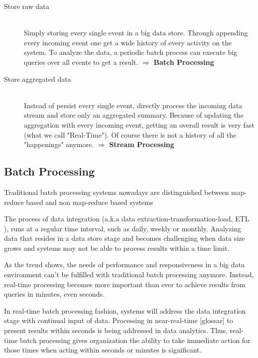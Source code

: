 \begin{description}
    \item[Store raw data]  \hfill \\
    {Simply storing every single event in a big data store. Through appending
    every incoming event one get a wide history of every activity on the system.
    To analyze the data, a periodic batch process can execute big queries over
    all events to get a result.  $ \Rightarrow $  \textbf{Batch Processing}}
    \item[Store aggregated data  ] \hfill \\
    {Instead of persist every single event, directly process the incoming data stream and store
    only an aggregated summary. Because of updating the aggregation with every
    incoming event, getting an overall result is very fast (what we call
    "Real-Time"). Of course there is not a history of all the "happenings"
    anymore. $ \Rightarrow $ \textbf{Stream Processing}} 
\end{description}
\cite{TalkKleppmann}


\subsection{Batch Processing}
\label{intro-datastream-batchprocessing}
Traditional batch processing systems nowadays are distinguished between
map-reduce based and non map-reduce based systems 

The process of  data integration (a.k.a data extraction-transformation-load, ETL
), runs at a regular time interval, such as daily, weekly or
monthly. Analyzing data that resides in a data store stage and becomes
challenging when data size grows and systems may not be able to process results
within a time limit. \cite{Liu:2014:SRP:2628194.2628251}

As the trend shows, the needs of performance and responsiveness in a big data
environment can't be fulfilled with traditional batch processing anymore.
Instead, real-time processing becomes more important than ever to achieve
results from queries in minutes, even seconds. 
\cite{bange2013big}

In real-time batch processing fashion, systems will address the data integration stage
with continual input of data. Processing in near-real-time [glossar] to present 
results within seconds is being addressed in data analytics. Thus,
real-time batch processing gives organization the ability to take immediate action
for those times when acting within seconds or minutes is significant.
\cite{PrpSvyOfDSPS}


